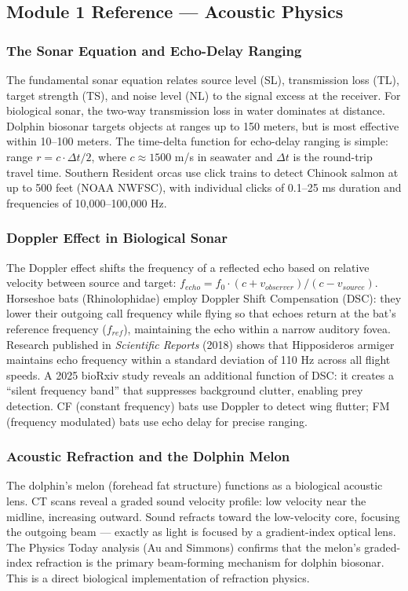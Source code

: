\documentclass[11pt,letterpaper]{article}
\begin{document}
\subsection{Module 1 Reference --- Acoustic Physics}

\subsubsection{The Sonar Equation and Echo-Delay Ranging}
The fundamental sonar equation relates source level (SL), transmission loss (TL), target strength (TS), and noise level (NL) to the signal excess at the receiver. For biological sonar, the two-way transmission loss in water dominates at distance. Dolphin biosonar targets objects at ranges up to 150 meters, but is most effective within 10--100 meters. The time-delta function for echo-delay ranging is simple: range $r = c \cdot \Delta t / 2$, where $c \approx 1500$ m/s in seawater and $\Delta t$ is the round-trip travel time. Southern Resident orcas use click trains to detect Chinook salmon at up to 500 feet (NOAA NWFSC), with individual clicks of 0.1--25 ms duration and frequencies of 10,000--100,000 Hz.

\subsubsection{Doppler Effect in Biological Sonar}
The Doppler effect shifts the frequency of a reflected echo based on relative velocity between source and target: $f_{echo} = f_0 \cdot (c + v_{observer})/(c - v_{source})$. Horseshoe bats (Rhinolophidae) employ Doppler Shift Compensation (DSC): they lower their outgoing call frequency while flying so that echoes return at the bat's reference frequency ($f_{ref}$), maintaining the echo within a narrow auditory fovea. Research published in \textit{Scientific Reports} (2018) shows that Hipposideros armiger maintains echo frequency within a standard deviation of 110 Hz across all flight speeds. A 2025 bioRxiv study reveals an additional function of DSC: it creates a ``silent frequency band'' that suppresses background clutter, enabling prey detection. CF (constant frequency) bats use Doppler to detect wing flutter; FM (frequency modulated) bats use echo delay for precise ranging.

\subsubsection{Acoustic Refraction and the Dolphin Melon}
The dolphin's melon (forehead fat structure) functions as a biological acoustic lens. CT scans reveal a graded sound velocity profile: low velocity near the midline, increasing outward. Sound refracts toward the low-velocity core, focusing the outgoing beam --- exactly as light is focused by a gradient-index optical lens. The Physics Today analysis (Au and Simmons) confirms that the melon's graded-index refraction is the primary beam-forming mechanism for dolphin biosonar. This is a direct biological implementation of refraction physics.
\end{document}
